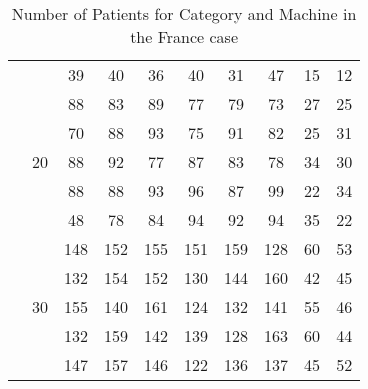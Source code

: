 \begin{table}[h]
\begin{tabular}{cc|c|c|c|c|c|c|c|c|}
\multicolumn{1}{|c|}{}                     &                     & 39              & 40            & 36              & 40            & 31              & 47            & 15              & 12            \\ \cline{2-10} 
\multicolumn{1}{|c|}{}                     & \multirow{5}{*}{20} & 88              & 83            & 89              & 77            & 79              & 73            & 27              & 25            \\ \cline{3-10} 
\multicolumn{1}{|c|}{}                     &                     & 70              & 88            & 93              & 75            & 91              & 82            & 25              & 31            \\ \cline{3-10} 
\multicolumn{1}{|c|}{}                     &                     & 88              & 92            & 77              & 87            & 83              & 78            & 34              & 30            \\ \cline{3-10} 
\multicolumn{1}{|c|}{}                     &                     & 88              & 88            & 93              & 96            & 87              & 99            & 22              & 34            \\ \cline{3-10} 
\multicolumn{1}{|c|}{}                     &                     & 48              & 78            & 84              & 94            & 92              & 94            & 35              & 22            \\ \cline{2-10} 
\multicolumn{1}{|c|}{}                     & \multirow{5}{*}{30} & 148             & 152           & 155             & 151           & 159             & 128           & 60              & 53            \\ \cline{3-10} 
\multicolumn{1}{|c|}{}                     &                     & 132             & 154           & 152             & 130           & 144             & 160           & 42              & 45            \\ \cline{3-10} 
\multicolumn{1}{|c|}{}                     &                     & 155             & 140           & 161             & 124           & 132             & 141           & 55              & 46            \\ \cline{3-10} 
\multicolumn{1}{|c|}{}                     &                     & 132             & 159           & 142             & 139           & 128             & 163           & 60              & 44            \\ \cline{3-10} 
\multicolumn{1}{|c|}{}                     &                     & 147             & 157           & 146             & 122           & 136             & 137           & 45              & 52            \\ \hline
\end{tabular}
\caption{Number of Patients for Category and Machine in the France case}
\end{table}